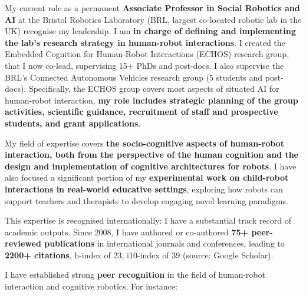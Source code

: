 My current role as a permanent \textbf{Associate Professor in Social Robotics
and AI} at the Bristol Robotics Laboratory (BRL, largest co-located robotic lab
in the UK) recognise my leadership. I am \textbf{in charge of defining and
implementing the lab's research strategy in human-robot interactions}. I created
the Embedded Cognition for Human-Robot Interactions (ECHOS) research group, that
I now co-lead, supervising 15+ PhDs and post-docs. I also supervise the BRL's
Connected Autonomous Vehicles research group (5 students and post-docs).
Specifically, the ECHOS group covers most aspects of situated AI for human-robot
interaction, \textbf{my role includes strategic planning of the group
activities, scientific guidance, recruitment of staff and prospective students,
and grant applications}.

My field of expertise covers \textbf{the socio-cognitive aspects of
human-robot interaction, both from the perspective of the human cognition and
the design and implementation of cognitive architectures for robots}. I have
also focused a significant portion of my \textbf{experimental work on
child-robot interactions in real-world educative settings}, exploring how robots
can support teachers and therapists to develop engaging novel
learning paradigms.

This expertise is recognised internationally: I have a substantial track record
of academic outputs. Since 2008, I have authored or co-authored \textbf{75+ peer-reviewed
publications} in international journals and conferences, leading to \textbf{2200+
citations}, h-index of 23, i10-index of 39 (source: Google Scholar).

I have established strong \textbf{peer recognition} in the field of human-robot interaction
and cognitive robotics. For instance:

